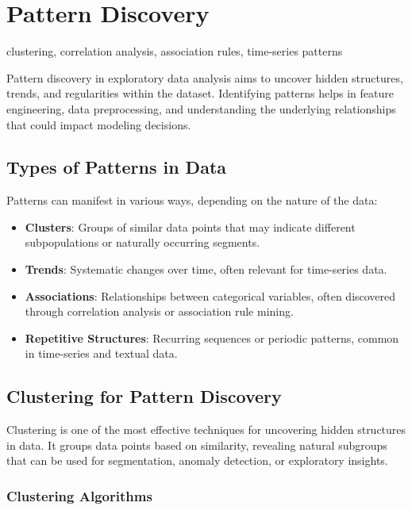 \documentclass[12pt,openany]{book}
\begin{document}
\section{Pattern Discovery}

\begin{keywordsbox}
clustering, correlation analysis, association rules, time-series patterns
\end{keywordsbox}

Pattern discovery in exploratory data analysis aims to uncover hidden structures, trends, and regularities within the dataset. Identifying patterns helps in feature engineering, data preprocessing, and understanding the underlying relationships that could impact modeling decisions.

\subsection{Types of Patterns in Data}

Patterns can manifest in various ways, depending on the nature of the data:
\begin{itemize}
    \item \textbf{Clusters}: Groups of similar data points that may indicate different subpopulations or naturally occurring segments.
    \item \textbf{Trends}: Systematic changes over time, often relevant for time-series data.
    \item \textbf{Associations}: Relationships between categorical variables, often discovered through correlation analysis or association rule mining.
    \item \textbf{Repetitive Structures}: Recurring sequences or periodic patterns, common in time-series and textual data.
\end{itemize}

\subsection{Clustering for Pattern Discovery}

Clustering is one of the most effective techniques for uncovering hidden structures in data. It groups data points based on similarity, revealing natural subgroups that can be used for segmentation, anomaly detection, or exploratory insights.

\subsubsection{Clustering Algorithms}
\end{document}
